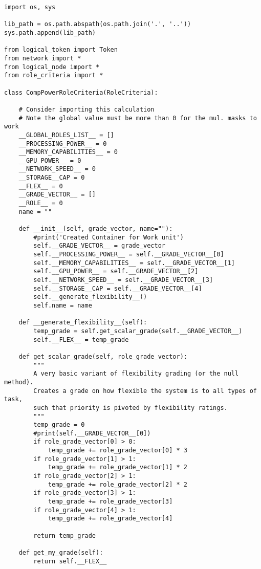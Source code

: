 \documentclass[11pt]{article}
\begin{document}
\lstset{frame=single, caption=Framework Listing}
\begin{lstlisting}
import os, sys

lib_path = os.path.abspath(os.path.join('.', '..'))
sys.path.append(lib_path)

from logical_token import Token
from network import *
from logical_node import *
from role_criteria import *

class CompPowerRoleCriteria(RoleCriteria):
    
    # Consider importing this calculation
    # Note the global value must be more than 0 for the mul. masks to work
    __GLOBAL_ROLES_LIST__ = []
    __PROCESSING_POWER__ = 0
    __MEMORY_CAPABILITIES__ = 0
    __GPU_POWER__ = 0
    __NETWORK_SPEED__ = 0
    __STORAGE__CAP = 0
    __FLEX__ = 0
    __GRADE_VECTOR__ = []
    __ROLE__ = 0
    name = ""
    
    def __init__(self, grade_vector, name=""):
        #print('Created Container for Work unit')
        self.__GRADE_VECTOR__ = grade_vector
        self.__PROCESSING_POWER__ = self.__GRADE_VECTOR__[0]
        self.__MEMORY_CAPABILITIES__ = self.__GRADE_VECTOR__[1]
        self.__GPU_POWER__ = self.__GRADE_VECTOR__[2]
        self.__NETWORK_SPEED__ = self.__GRADE_VECTOR__[3]
        self.__STORAGE__CAP = self.__GRADE_VECTOR__[4]
        self.__generate_flexibility__()
        self.name = name
        
    def __generate_flexibility__(self):
        temp_grade = self.get_scalar_grade(self.__GRADE_VECTOR__)
        self.__FLEX__ = temp_grade
        
    def get_scalar_grade(self, role_grade_vector):
        """
        A very basic variant of flexibility grading (or the null method).  
        Creates a grade on how flexible the system is to all types of task,
        such that priority is pivoted by flexibility ratings. 
        """
        temp_grade = 0
        #print(self.__GRADE_VECTOR__[0])
        if role_grade_vector[0] > 0:
            temp_grade += role_grade_vector[0] * 3
        if role_grade_vector[1] > 1:
            temp_grade += role_grade_vector[1] * 2
        if role_grade_vector[2] > 1:
            temp_grade += role_grade_vector[2] * 2
        if role_grade_vector[3] > 1:
            temp_grade += role_grade_vector[3]
        if role_grade_vector[4] > 1:
            temp_grade += role_grade_vector[4]
            
        return temp_grade
    
    def get_my_grade(self):
        return self.__FLEX__
    

\end{lstlisting}
\end{document}
